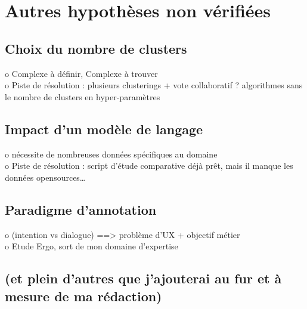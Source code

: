 \section{Autres hypothèses non vérifiées}
\label{section:4.7-HYPOTHESES-NON-VERIFIEES}

	\subsection{Choix du nombre de clusters}
		o Complexe à définir, Complexe à trouver \\
		o Piste de résolution : plusieurs clusterings + vote collaboratif ? algorithmes sans le nombre de clusters en hyper-paramètres

	\subsection{Impact d'un modèle de langage}
		o nécessite de nombreuses données spécifiques au domaine \\
		o Piste de résolution : script d'étude comparative déjà prêt, mais il manque les données opensources… 

	\subsection{Paradigme d’annotation}
		o (intention vs dialogue) ==> problème d'UX + objectif métier \\
		o Etude Ergo, sort de mon domaine d'expertise

	\subsection{(et plein d'autres que j'ajouterai au fur et à mesure de ma rédaction)}

